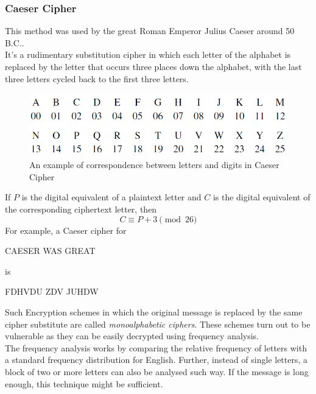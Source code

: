 \documentclass{article}
\begin{document}
\subsubsection{Caeser Cipher}
This method was used by the great Roman Emperor Julius Caeser around 50 {\small B.C.}.\\
It's a rudimentary substitution cipher in which each letter of the alphabet is replaced by the letter that occurs three places down the alphabet, with the last three letters cycled back to the first three letters.\\
\begin{figure}[h]
    \centering
    \includegraphics[width=\textwidth]{caeser.png}
    \caption{An example of correspondence between letters and digits in Caeser Cipher \cite{caeser}}
    \label{fig:caeser}
\end{figure}
If $P$ is the digital equivalent of a plaintext letter and $C$ is the digital equivalent of
the corresponding ciphertext letter, then
\begin{equation*}
    C \equiv P + 3 \pmod {26}
\end{equation*}
For example, a Caeser cipher for 
\begin{center}    
    CAESER WAS GREAT
\end{center}
is 
\begin{center}
    FDHVDU ZDV JUHDW
\end{center}

Such Encryption schemes in which the original message is replaced by the same cipher substitute are called {\it monoalphabetic ciphers}. These schemes turn out to be vulnerable as they can be easily decrypted using frequency analysis.\\
The frequency analysis works by comparing the relative frequency of letters with a standard frequency distribution for English. Further, instead of single letters, a block of two or more letters can also be analysed such way. If the message is long enough, this technique might be sufficient.
\end{document}
